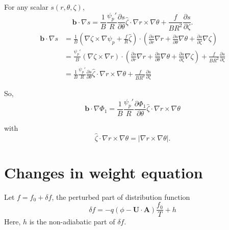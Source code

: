 \documentclass[12pt]{article}
\begin{document}
\begin{CJK*}{UTF8}{gbsn}
For any scalar $s(r,\theta,\zeta)$,
\begin{equation}
    \mathbf{b}\cdot\nabla s=\frac{1}{B}\frac{\psi_p'}{R}\frac{\partial s}{\partial \theta}\hat{\zeta}\cdot\nabla r \times \nabla\theta
    + \frac{f}{BR^2}\frac{\partial s}{\partial \zeta}.
\end{equation}
{\color{cyan}
\begin{equation*}
\begin{split}
    \mathbf{b}\cdot\nabla s&=\frac{1}{B}(\nabla\zeta\times\nabla\psi_p+\frac{f}{R}\hat{\zeta})\cdot(\frac{\partial s}{\partial r}\nabla r
    +\frac{\partial s}{\partial \theta}\nabla \theta+\frac{\partial s}{\partial \zeta}\nabla \zeta)\\
    &=\frac{\psi_p'}{B}(\nabla\zeta\times\nabla r)\cdot(\frac{\partial s}{\partial r}\nabla r
    +\frac{\partial s}{\partial \theta}\nabla \theta+\frac{\partial s}{\partial \zeta}\nabla \zeta)+\frac{f}{BR^2}\frac{\partial s}{\partial\zeta}\\
    &=\frac{1}{B}\frac{\psi_p'}{R}\frac{\partial s}{\partial \theta}\hat{\zeta}\cdot\nabla r \times \nabla\theta
    + \frac{f}{BR^2}\frac{\partial s}{\partial \zeta}
\end{split}
\end{equation*}
}

So,
\begin{equation}
    \mathbf{b}\cdot\nabla \Phi_1=\frac{1}{B}\frac{\psi_p'}{R}\frac{\partial \Phi_1}{\partial \theta}\hat{\zeta}\cdot\nabla r \times \nabla\theta
\end{equation}

with
\begin{equation}
    \hat{\zeta}\cdot\nabla r \times \nabla\theta = |\nabla r \times \nabla\theta|.
\end{equation}


\newpage
\section{Changes in weight equation} 
Let $f=f_0+\delta f$, the perturbed part of distribution function
\begin{equation}
    \delta f = -q(\phi - \mathbf{U\cdot A})\frac{f_0}{T} + h
\end{equation}
Here, $h$ is the non-adiabatic part of $\delta f$. 


\end{CJK*}
\end{document}
